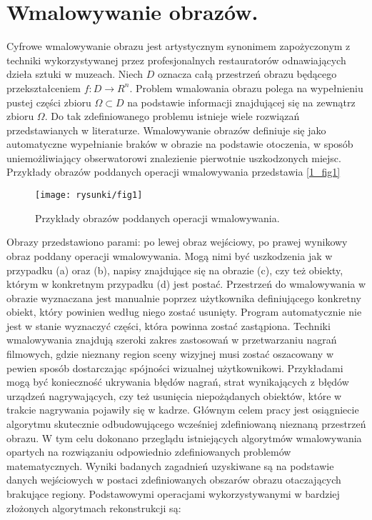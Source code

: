 \documentclass[12pt, twoside, openany]{report}
\theoremstyle{definition}
\begin{document}
\section{Wmalowywanie obrazów.}

Cyfrowe wmalowywanie obrazu jest artystycznym synonimem zapożyczonym z techniki wykorzystywanej przez profesjonalnych restauratorów odnawiających dzieła sztuki w muzeach. Niech $D$ oznacza całą przestrzeń obrazu będącego przekształceniem $f: D \rightarrow R^{n}$. Problem wmalowania obrazu polega na wypełnieniu pustej części zbioru $\Omega \subset D$ na podstawie informacji znajdującej się na zewnątrz zbioru $\Omega$. Do tak zdefiniowanego problemu istnieje wiele rozwiązań przedstawianych w literaturze. Wmalowywanie obrazów definiuje się jako automatyczne wypełnianie braków w obrazie na podstawie otoczenia, w sposób uniemożliwiający obserwatorowi znalezienie pierwotnie uszkodzonych miejsc. Przykłady obrazów poddanych operacji wmalowywania przedstawia \autoref{1_fig1} 
\begin{figure}[!h]
	\centering
	\texttt{[image: rysunki/fig1]}
	\caption{Przykłady obrazów poddanych operacji wmalowywania.}
	\label{1_fig1}
\end{figure}
\par
Obrazy przedstawiono parami: po lewej obraz wejściowy, po prawej wynikowy obraz poddany operacji wmalowywania. Mogą nimi być uszkodzenia jak w przypadku (a) oraz (b), napisy znajdujące się na obrazie (c), czy też obiekty, którym w konkretnym przypadku (d) jest postać. Przestrzeń do wmalowywania w obrazie wyznaczana jest manualnie poprzez użytkownika definiującego konkretny obiekt, który powinien według niego zostać usunięty. Program automatycznie nie jest w stanie wyznaczyć części, która powinna zostać zastąpiona. 
Techniki wmalowywania znajdują szeroki zakres zastosowań w przetwarzaniu nagrań filmowych, gdzie nieznany region sceny wizyjnej musi zostać oszacowany w pewien sposób dostarczając spójności wizualnej użytkownikowi. Przykładami mogą być konieczność ukrywania błędów nagrań, strat wynikających z błędów urządzeń nagrywających, czy też usunięcia niepożądanych obiektów, które w trakcie nagrywania pojawiły się w kadrze. Głównym celem pracy jest osiągniecie algorytmu skutecznie odbudowującego wcześniej zdefiniowaną nieznaną przestrzeń obrazu. W tym celu dokonano przeglądu istniejących algorytmów wmalowywania opartych na rozwiązaniu odpowiednio zdefiniowanych problemów matematycznych. Wyniki badanych zagadnień uzyskiwane są na podstawie danych wejściowych w postaci zdefiniowanych obszarów obrazu otaczających brakujące regiony. Podstawowymi operacjami wykorzystywanymi w bardziej złożonych algorytmach rekonstrukcji są:
\end{document}
